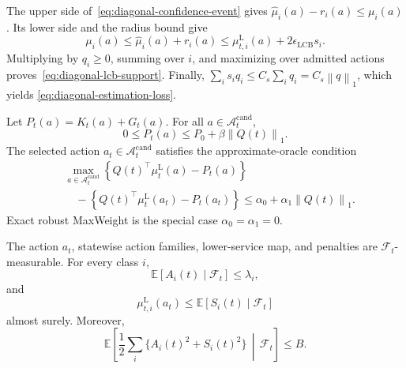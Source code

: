 \documentclass[opre,dblanonrev]{informs4}
\newcommand{\Acand}{\mathcal A^{\mathrm{cand}}}
\newcommand{\E}{\mathbb E}
\newcommand{\lowermu}{\mu^{\mathrm L}}
\newcommand{\normone}[1]{\left\|#1\right\|_1}
\begin{document}
The upper side of~\eqref{eq:diagonal-confidence-event} gives
\(\widehat\mu_i(a)-r_i(a)\le\mu_i(a)\).  Its lower side and the radius bound
give
\begin{equation}
  \mu_i(a)
  \le
  \widehat\mu_i(a)+r_i(a)
  \le
  \lowermu_{t,i}(a)+2\epsilon_{\mathrm{LCB}}s_i.
\end{equation}
Multiplying by \(q_i\ge0\), summing over \(i\), and maximizing over admitted
actions proves~\eqref{eq:diagonal-lcb-support}.  Finally,
\(\sum_i s_iq_i\le C_s\sum_iq_i=C_s\normone{q}\), which yields
\eqref{eq:diagonal-estimation-loss}.
\endproof

\begin{assumption}
\label{ass:penalty-oracle}
Let \(P_t(a)=K_t(a)+G_t(a)\).  For all \(a\in\Acand_t\),
\begin{equation}
  0\le P_t(a)\le P_0+\beta\normone{Q(t)}.
\end{equation}
The selected action \(a_t\in\Acand_t\) satisfies the approximate-oracle
condition
\begin{equation}
  \begin{aligned}
  &\max_{a\in\Acand_t}
  \left\{Q(t)^\top\lowermu_t(a)-P_t(a)\right\}\\
  &\quad{}-
  \left\{Q(t)^\top\lowermu_t(a_t)-P_t(a_t)\right\}
  \le \alpha_0+\alpha_1\normone{Q(t)}.
  \end{aligned}
\end{equation}
Exact robust MaxWeight is the special case
\(\alpha_0=\alpha_1=0\).
\end{assumption}

\begin{assumption}
\label{ass:stochastic-moments}
The action \(a_t\), statewise action families, lower-service map, and penalties
are \(\mathcal F_t\)-measurable.  For every class \(i\),
\begin{equation}
  \E[A_i(t)\mid\mathcal F_t]\le\lambda_i,
\end{equation}
and
\begin{equation}
  \lowermu_{t,i}(a_t)
  \le \E[S_i(t)\mid\mathcal F_t]
\end{equation}
almost surely.  Moreover,
\begin{equation}
  \E\!\left[
    \frac12\sum_i\{A_i(t)^2+S_i(t)^2\}
    \,\middle|\,\mathcal F_t
  \right]
  \le B.
\end{equation}
\end{assumption}
\end{document}
